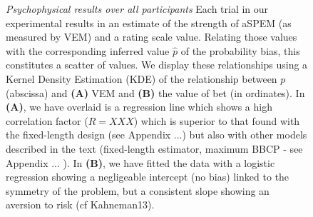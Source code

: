 \documentclass[12pt,english]{article}%
\newcommand{\CP}[1]{\textbf{\textcolor{green}{[CP: #1]}}}
\begin{document}
\begin{figure}
\caption{ \emph{Psychophysical results over all participants}
Each trial in our experimental results in an estimate of
the strength of aSPEM (as measured by VEM)
and a rating scale value.
Relating those values with the corresponding inferred value $\hat{p}$
of the probability bias,
this constitutes a scatter of values.
We display these relationships using a
Kernel Density Estimation (KDE) of the relationship between $p$ (abscissa)
and \textbf{(A)} VEM and \textbf{(B)} the value of bet (in ordinates).
In \textbf{(A)}, we have overlaid is a regression line which shows
a high correlation factor ($R=XXX$) which is superior to that found
with the fixed-length design (see Appendix ...)
but also with other models described in the text
(fixed-length estimator, maximum BBCP - see Appendix ... ).
In \textbf{(B)}, we have fitted the data with a logistic regression
showing a negligeable intercept (no bias) linked to the symmetry
of the problem, but a consistent slope showing an aversion to risk
(cf Kahneman13).
}

\label{fig:results_psycho}
\end{figure}
\end{document}
